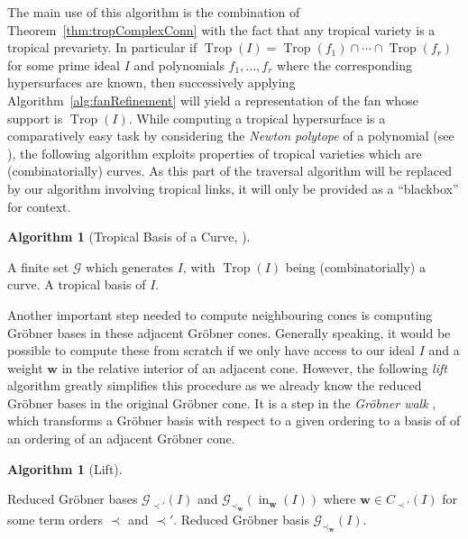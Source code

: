 \documentclass[
  paper=a4,
  titlepage,
  bibliography=totoc,
  pagesize=pdftex
]{scrartcl}
\numberwithin{figure}{section}
\numberwithin{equation}{section}
\numberwithin{table}{section}
\let\vec\mathbf
\DeclareMathOperator{\Trop}{Trop}
\DeclareMathOperator{\initial}{in}
\theoremstyle{definition}
\newtheorem{algo}[definition]{Algorithm}
\numberwithin{definition}{section}
\begin{document}
The main use of this algorithm is the combination of Theorem~\ref{thm:tropComplexConn}
with the fact that any tropical variety is a tropical prevariety. In particular if
$\Trop(I) = \Trop(f_1) \cap \cdots \cap \Trop(f_r)$ for some prime ideal $I$ and
polynomials $f_1, \dots, f_r$ where the corresponding hypersurfaces are known, then
successively applying Algorithm~\ref{alg:fanRefinement} will yield a representation of the
fan whose support is $\Trop(I)$. While computing a tropical hypersurface is a
comparatively easy task by considering the \emph{Newton polytope} of a polynomial (see
\cite[Algorithm~4.3]{compTropVar}), the following algorithm exploits properties of
tropical varieties which are (combinatorially) curves. As this part of the traversal
algorithm will be replaced by our algorithm involving tropical links, it will only be
provided as a \enquote{blackbox} for context.

\begin{algo}[Tropical Basis of a Curve, {\cite[Algorihm~4.8]{compTropVar}}]\
  \label{alg:tropBasisCurve}
  \begin{algorithmic}[1]
    \Require A finite set $\mathcal G$ which generates $I$, with $\Trop(I)$ being
      (combinatorially) a curve.
    \Ensure A tropical basis of $I$.
  \end{algorithmic}
\end{algo}

Another important step needed to compute neighbouring cones is computing Gröbner bases in
these adjacent Gröbner cones. Generally speaking, it would be possible to compute these
from scratch if we only have access to our ideal $I$ and a weight $\vec w$ in the relative
interior of an adjacent cone. However, the following \emph{lift} algorithm greatly
simplifies this procedure as we already know the reduced Gröbner bases in the original
Gröbner cone. It is a step in the \emph{Gröbner walk} \cite{groebWalk}, which transforms a
Gröbner basis with respect to a given ordering to a basis of of an ordering of an adjacent
Gröbner cone.

\begin{algo}[Lift]\
  \label{alg:lift}
  \begin{algorithmic}[1]
    \Require Reduced Gröbner bases $\mathcal G_{\prec'}(I)$ and $\mathcal G_{\prec_{\vec
      w}}(\initial_{\vec w}(I))$ where $\vec w \in C_{\prec'}(I)$ for some term orders
      $\prec$ and $\prec'$.
    \Ensure Reduced Gröbner basis $\mathcal G_{\prec_{\vec w}}(I)$.
  \end{algorithmic}
\end{algo}
\end{document}
